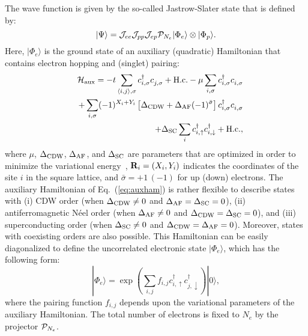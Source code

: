 \documentclass[aps,superscriptaddress,amsmath,amssymb,twocolumn,showpacs,floatfix,english]{revtex4}
\newcommand{\dagga}{{\phantom{\dagger}}}
\begin{document}
The wave function is given by the so-called Jastrow-Slater state that is defined by:
\begin{equation}\label{eq:wf}
|\Psi\rangle = {\cal J}_{ee} {\cal J}_{pp} {\cal J}_{ep} {\cal P}_{N_e} |\Phi_{e}\rangle \otimes |\Phi_{p}\rangle.
\end{equation}
Here, $|\Phi_{e}\rangle$ is the ground state of an auxiliary (quadratic) Hamiltonian that contains electron hopping and (singlet) 
pairing:
\begin{eqnarray}
&& {\cal H}_{\rm aux} = -t \sum_{\langle i,j \rangle,\sigma} c^\dag_{i,\sigma} c^\dagga_{j,\sigma} + {\rm H.c.}
- \mu \sum_{i,\sigma} c^\dag_{i,\sigma} c^\dagga_{i,\sigma} \nonumber \\
&& + \sum_{i,\sigma} (-1)^{X_i+Y_i} \left [ \Delta_{\rm CDW} + \Delta_{\rm AF} (-1)^{\bar{\sigma}} \right ] 
c^\dag_{i,\sigma} c^\dagga_{i,\sigma} \nonumber \\
&& +\Delta_{\rm SC} \sum_{i} c^\dag_{i,\uparrow} c^\dag_{i,\downarrow} + {\rm H.c.},
\label{eq:auxham}
\end{eqnarray}
where $\mu$, $\Delta_{\rm CDW}$, $\Delta_{\rm AF}$, and $\Delta_{\rm SC}$ are parameters that are optimized in order to minimize the 
variational energy~\cite{Sorella2005}, ${\bf R}_i=(X_i,Y_i)$ indicates the coordinates of the site $i$ in the square lattice, and 
$\bar{\sigma}=+1\, (-1)$ for up (down) electrons. The auxiliary Hamiltonian of Eq.~(\ref{eq:auxham}) is rather flexible to describe 
states with (i) CDW order (when $\Delta_{\rm CDW} \ne 0$ and $\Delta_{\rm AF}=\Delta_{\rm SC}=0$), (ii) antiferromagnetic N\'eel order 
(when $\Delta_{\rm AF} \ne 0$ and $\Delta_{\rm CDW}=\Delta_{\rm SC}=0$), and (iii) superconducting order (when $\Delta_{\rm SC} \ne 0$ 
and $\Delta_{\rm CDW}=\Delta_{\rm AF}=0$). Moreover, states with coexisting orders are also possible. This Hamiltonian can be easily 
diagonalized to define the uncorrelated electronic state $|\Phi_{e}\rangle$, which has the following form:
\begin{equation}\label{eq:wfelec}
|\Phi_{e}\rangle = \exp \left ( \sum_{i,j} f_{i,j} c^\dag_{i,\uparrow} c^\dag_{j,\downarrow} \right )|0\rangle,
\end{equation}
where the pairing function $f_{i,j}$ depends upon the variational parameters of the auxiliary Hamiltonian. The total number of 
electrons is fixed to $N_e$ by the projector ${\cal P}_{N_e}$. 
\end{document}
